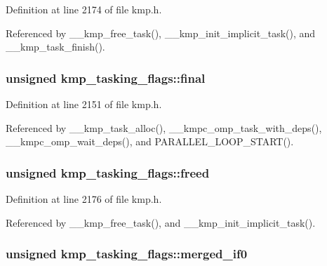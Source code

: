 Definition at line 2174 of file kmp.\-h.



Referenced by \-\_\-\-\_\-kmp\-\_\-free\-\_\-task(), \-\_\-\-\_\-kmp\-\_\-init\-\_\-implicit\-\_\-task(), and \-\_\-\-\_\-kmp\-\_\-task\-\_\-finish().

\hypertarget{structkmp__tasking__flags_adc49b76236bc45b6c68457f8e81230b7}{
\subsubsection[{final}]{\setlength{\rightskip}{0pt plus 5cm}unsigned kmp\-\_\-tasking\-\_\-flags\-::final}}\label{structkmp__tasking__flags_adc49b76236bc45b6c68457f8e81230b7}


Definition at line 2151 of file kmp.\-h.



Referenced by \-\_\-\-\_\-kmp\-\_\-task\-\_\-alloc(), \-\_\-\-\_\-kmpc\-\_\-omp\-\_\-task\-\_\-with\-\_\-deps(), \-\_\-\-\_\-kmpc\-\_\-omp\-\_\-wait\-\_\-deps(), and P\-A\-R\-A\-L\-L\-E\-L\-\_\-\-L\-O\-O\-P\-\_\-\-S\-T\-A\-R\-T().

\hypertarget{structkmp__tasking__flags_a44b2b3bfa5de44e0c8c8f8f63cf0c32c}{
\subsubsection[{freed}]{\setlength{\rightskip}{0pt plus 5cm}unsigned kmp\-\_\-tasking\-\_\-flags\-::freed}}\label{structkmp__tasking__flags_a44b2b3bfa5de44e0c8c8f8f63cf0c32c}


Definition at line 2176 of file kmp.\-h.



Referenced by \-\_\-\-\_\-kmp\-\_\-free\-\_\-task(), and \-\_\-\-\_\-kmp\-\_\-init\-\_\-implicit\-\_\-task().

\hypertarget{structkmp__tasking__flags_a21feec95b8d05beac5923ca04b98ad0e}{
\subsubsection[{merged\-\_\-if0}]{\setlength{\rightskip}{0pt plus 5cm}unsigned kmp\-\_\-tasking\-\_\-flags\-::merged\-\_\-if0}}\label{structkmp__tasking__flags_a21feec95b8d05beac5923ca04b98ad0e}


